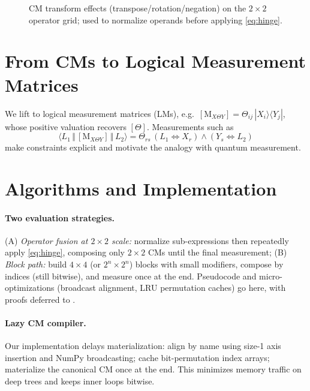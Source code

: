 \documentclass[11pt]{article}
\newcommand{\CM}[1]{[{#1}]}
\begin{document}
\begin{figure}[t]
  \centering
  \fbox{\rule{0pt}{1.45in}\rule{0.88\linewidth}{0pt}}
  \caption{CM transform effects (transpose/rotation/negation) on the $2\times2$ operator grid; used to normalize operands before applying \eqref{eq:hinge}.}
  \label{fig:breakdown}
\end{figure}

\section{From CMs to Logical Measurement Matrices}
\label{sec:lms}
We lift to logical measurement matrices (LMs), e.g.\ $[\mathrm{M}_{X\Theta Y}] = \Theta_{ij}\,|X_i\rangle\!\langle Y_j|$, whose positive valuation recovers $\CM{\Theta}$.
Measurements such as
\begin{equation}
\label{eq:lm-meas}
\langle L_1 \,\Vert\, [\mathrm{M}_{X\Theta Y}] \,\Vert\, L_2\rangle
=\Theta_{rs}\,(L_1\Leftrightarrow X_r)\wedge(Y_s\Leftrightarrow L_2)
\end{equation}
make constraints explicit and motivate the analogy with quantum measurement.

\section{Algorithms and Implementation}
\label{sec:impl}
\paragraph{Two evaluation strategies.}
(A) \emph{Operator fusion at $2\times2$ scale:} normalize sub-expressions then repeatedly apply \eqref{eq:hinge}, composing only $2\times2$ CMs until the final measurement;
(B) \emph{Block path:} build $4\times4$ (or $2^n\times2^n$) blocks with small modifiers, compose by indices (still bitwise), and measure once at the end.
Pseudocode and micro-optimizations (broadcast alignment, LRU permutation caches) go here, with proofs deferred to .

\paragraph{Lazy CM compiler.}
Our implementation delays materialization: align by name using size-1 axis insertion and NumPy broadcasting; cache bit-permutation index arrays; materialize the canonical CM once at the end. This minimizes memory traffic on deep trees and keeps inner loops bitwise.
\end{document}
